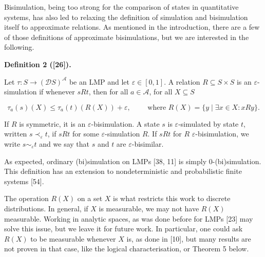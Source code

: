 \documentclass[10pt,a4paper]{article}
\begin{document}
 
Bisimulation, being too strong for the comparison of states in quantitative systems, has also led to relaxing the definition of simulation and bisimulation itself to approximate relations. As mentioned in the introduction, there are a few of those definitions of approximate bisimulations, but we are interested in the following.\par
 
 
 
\par\medskip\noindent\textbf{Definition 2 ([26]).}\par
 
 
Let $\tau:S\to(\mathcal{D}S)^{\mathcal{A}}$ be an LMP and let $\varepsilon\in[0,1]$. A relation $R\subseteq S\times S$ is an $\varepsilon$-simulation if whenever $sRt$, then for all $a\in\mathcal{A}$, for all $X\subseteq S$\par
  
\par  \quad  \[\tau_{a}(s)(X)\leq\tau_{a}(t)({R}(X))+\varepsilon,\qquad\mbox{ where }R(X)=\{y\mid\exists x\in X:xRy\}.\]\quad  \quad  
  
If $R$ is symmetric, it is an $\varepsilon$-bisimulation. A state $s$ is $\varepsilon$-simulated by state $t$, written $s\prec_{\varepsilon}t$, if $sRt$ for some $\varepsilon$-simulation $R$. If $sRt$ for $R$ $\varepsilon$-bisimulation, we write $s\sim_{\varepsilon}t$ and we say that $s$ and $t$ are $\varepsilon$-bisimilar.\par
 
 
 
 
As expected, ordinary (bi)simulation on LMPs [38, 11] is simply $0$-(bi)simulation. This definition has an extension to nondeterministic and probabilistic finite systems [54].\par
 
 
 
The operation $R(X)$ on a set $X$ is what restricts this work to discrete distributions. In general, if $X$ is measurable, we may not have $R(X)$ measurable. Working in analytic spaces, as was done before for LMPs [23] may solve this issue, but we leave it for future work. In particular, one could ask $R(X)$ to be measurable whenever $X$ is, as done in [10], but many results are not proven in that case, like the logical characterisation, or Theorem 5 below.\par
 
\end{document}

